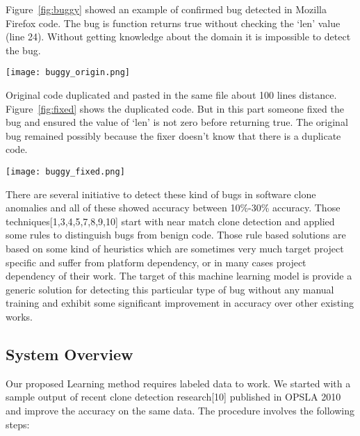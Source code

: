 \documentclass[11pt]{article}
\begin{document}
\vspace{10 pt}
\noindent
Figure~\ref{fig:buggy} showed an example of confirmed bug detected in Mozilla Firefox code. The bug is function returns true without checking the ‘len’ value (line 24). Without getting knowledge about the domain it is impossible to detect the bug.

\begin{figure*}[t!]
\centering
\texttt{[image: buggy\_origin.png]}
\caption{Buggy copy of the clone}
\label{fig:buggy}
\end{figure*}

\vspace{10 pt}
\noindent
Original code duplicated and pasted in the same file about 100 lines distance. Figure~\ref{fig:fixed} shows the duplicated code. But in this part someone fixed the bug and ensured the value of ‘len’ is not zero before returning true. The original bug remained possibly because the fixer doesn’t know that there is a duplicate code.

\begin{figure*}[t!]
\centering
\texttt{[image: buggy\_fixed.png]}
\caption{Fixed copy of the clone}
\label{fig:fixed}
\end{figure*}

\vspace{10 pt}
\noindent
There are several initiative to detect these kind of bugs in software clone anomalies and all of these showed accuracy between 10\%-30\% accuracy. Those techniques[1,3,4,5,7,8,9,10] start with near match clone detection and applied some rules to distinguish bugs from benign code. Those rule based solutions are based on some kind of heuristics which are sometimes very much target project specific and suffer from platform dependency, or in many cases project dependency of their work. The target of this machine learning model is provide a generic solution for detecting this particular type of bug without any manual training and exhibit some significant improvement in accuracy over other existing works.

\subsection{System Overview}
Our proposed Learning method requires labeled data to work. We started with a sample output of recent clone detection research[10] published in OPSLA 2010 and improve the accuracy on the same data. The procedure involves the following steps:
\end{document}
